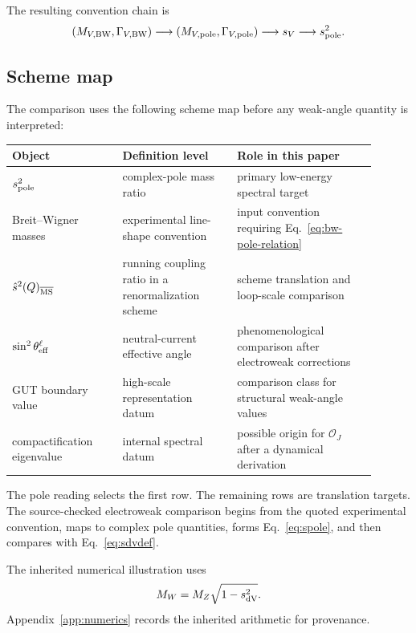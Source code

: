 The resulting convention chain is
\begin{equation}
  (M_{V,\rm BW},\Gamma_{V,\rm BW})
  \longrightarrow
  (M_{V,\rm pole},\Gamma_{V,\rm pole})
  \longrightarrow
  s_V
  \longrightarrow
  s^2_{\rm pole} .
  \label{eq:convention-chain}
\end{equation}

\subsection{Scheme map}

The comparison uses the following scheme map before any weak-angle quantity is interpreted:
\begin{center}
\footnotesize
\begin{tabular}{p{0.27\linewidth}p{0.29\linewidth}p{0.34\linewidth}}
\toprule
Object & Definition level & Role in this paper\\
\midrule
\(s^2_{\rm pole}\) & complex-pole mass ratio & primary low-energy spectral target\\
Breit--Wigner masses & experimental line-shape convention & input convention requiring Eq.~\eqref{eq:bw-pole-relation}\\
\(\hat s^2(Q)_{\overline{\mathrm{MS}}}\) & running coupling ratio in a renormalization scheme & scheme translation and loop-scale comparison\\
\(\sin^2\theta_{\rm eff}^{\ell}\) & neutral-current effective angle & phenomenological comparison after electroweak corrections\\
GUT boundary value & high-scale representation datum & comparison class for structural weak-angle values\\
compactification eigenvalue & internal spectral datum & possible origin for \(\mathcal O_J\) after a dynamical derivation\\
\bottomrule
\end{tabular}
\end{center}

The pole reading selects the first row.  The remaining rows are translation targets.  The source-checked electroweak comparison begins from the quoted experimental convention, maps to complex pole quantities, forms Eq.~\eqref{eq:spole}, and then compares with Eq.~\eqref{eq:sdvdef}.

The inherited numerical illustration uses
\begin{equation}
  M_W=M_Z\sqrt{1-s^2_{\rm dV}}.
  \label{eq:MWfromMZ}
\end{equation}
Appendix~\ref{app:numerics} records the inherited arithmetic for provenance.


